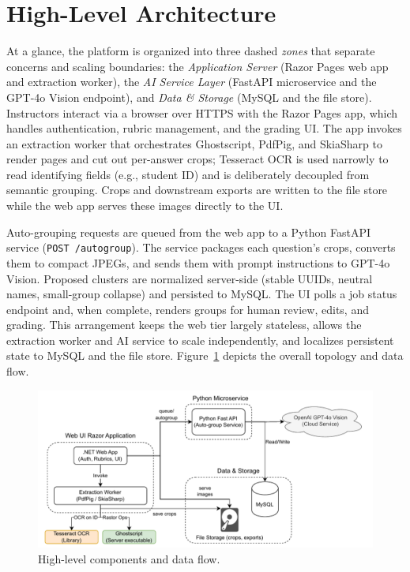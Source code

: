 \documentclass[ms,twoside,print]{nuthesis}
\begin{document}
\section{High-Level Architecture}
At a glance, the platform is organized into three dashed \emph{zones} that separate concerns and scaling boundaries: the \emph{Application Server} (Razor Pages web app and extraction worker), the \emph{AI Service Layer} (FastAPI microservice and the GPT-4o Vision endpoint), and \emph{Data \& Storage} (MySQL and the file store). Instructors interact via a browser over HTTPS with the Razor Pages app, which handles authentication, rubric management, and the grading UI. The app invokes an extraction worker that orchestrates Ghostscript, PdfPig, and SkiaSharp to render pages and cut out per-answer crops; Tesseract OCR is used narrowly to read identifying fields (e.g., student ID) and is deliberately decoupled from semantic grouping. Crops and downstream exports are written to the file store while the web app serves these images directly to the UI.

Auto-grouping requests are queued from the web app to a Python FastAPI service (\texttt{POST /autogroup}). The service packages each question’s crops, converts them to compact JPEGs, and sends them with prompt instructions to GPT-4o Vision. Proposed clusters are normalized server-side (stable UUIDs, neutral names, small-group collapse) and persisted to MySQL. The UI polls a job status endpoint and, when complete, renders groups for human review, edits, and grading. This arrangement keeps the web tier largely stateless, allows the extraction worker and AI service to scale independently, and localizes persistent state to MySQL and the file store. Figure~\ref{fig:architecture} depicts the overall topology and data flow.

\begin{figure}[htb]
  \centering
  \includegraphics[width=\linewidth]{images/architecture.drawio.pdf}
  \caption{High-level components and data flow.}
  \label{fig:architecture}
\end{figure}
\end{document}
